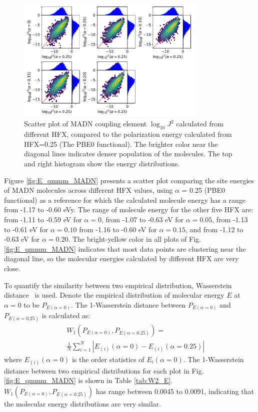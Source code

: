 \documentclass[%
 reprint,
superscriptaddress,
 amsmath,amssymb,
 aps,
prb,
floatfix
]{revtex4-2}
\begin{document}
\begin{figure}
  \centering
  \includegraphics[width=0.80\textwidth]{figs/scatterJ_all.pdf}
  \caption{Scatter plot of MADN coupling element $\log_{10} J^2$ calculated from different HFX, compared to the polarization energy calculated from HFX=0.25 (The PBE0 functional). The brighter color near the diagonal lines indicates denser population of the molecules.  The top and right histogram show the energy distributions.}
  \label{fig:J_MADN}
\end{figure}

Figure \ref{fig:E_qmmm_MADN} presents a scatter plot comparing the site energies of MADN molecules across different HFX values, using $\alpha$ = 0.25 (PBE0 functional) as a reference for which the calculated molecule energy has a range from -1.17 to -0.60 \unit[]{eV}y.
The range of molecule energy for the other five HFX are: 
from -1.11 to -0.59 \unit[]{eV} for $\alpha=0$, 
from -1.07 to -0.63 \unit[]{eV} for $\alpha=0.05$, 
from -1.13 to -0.61 \unit[]{eV} for $\alpha=0.10$
from -1.16 to -0.60 \unit[]{eV} for $\alpha=0.15$, 
and from -1.12 to -0.63 \unit[]{eV} for $\alpha=0.20$.
The bright-yellow color in all plots of Fig. \ref{fig:E_qmmm_MADN} indicates that most data points are clustering near the diagonal line, so the molecular energies calculated by different HFX are very close.

To quantify the similarity between two empirical distribution, Wasserstein distance~\cite{villani_optimal_2009} is used.
Denote the empirical distribution of molecular energy $E$ at $\alpha=0$ to be $P_{E(\alpha=0)}$. 
The 1-Wasserstein distance between $P_{E(\alpha=0)}$ and $P_{E(\alpha=0.25)}$ is calculated as:
\begin{eqnarray}
    && W_1 (P_{E(\alpha=0)}, P_{E(\alpha=0.25)}) = \nonumber \\
    && \frac{1}{N} \sum\limits_{i=1}^N | E_{(i)}(\alpha=0) - E_{(i)}(\alpha=0.25) |
\end{eqnarray}
where $E_{(i)}(\alpha=0)$ is the order statistics of $E_i(\alpha=0)$. The 1-Wasserstein distance between two empirical distributions for each plot in Fig. \ref{fig:E_qmmm_MADN} is shown in Table \ref{tab:W2_E}. $W_1 (P_{E(\alpha=0)}, P_{E(\alpha=0.25)})$ has range between 0.0045 to 0.0091, indicating that the molecular energy distributions are very similar. 
\end{document}
